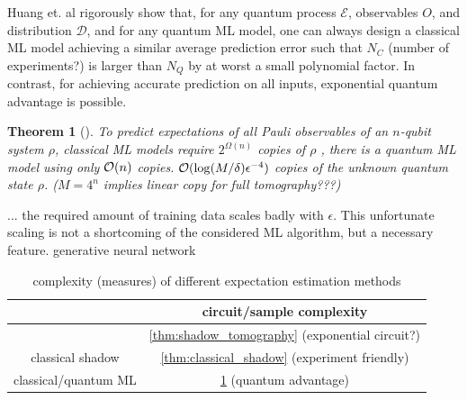 \documentclass[
reprint,
aps,
pra,
floatfix,
]{revtex4-2}
\theoremstyle{plain}
\newtheorem{theorem}{Theorem}
\theoremstyle{definition}
\newcommand{\ob}{O}
\newcommand{\dm}{\rho}
\begin{document}
Huang et. al rigorously show that, for any quantum process $\mathcal{E}$, observables $\ob$, and distribution $\mathcal{D}$, and for any quantum ML model, one can always design a classical ML model achieving a similar average prediction error such that $N_C$ (number of experiments?) is larger than $N_Q$ by at worst a small polynomial factor.
In contrast, for achieving accurate prediction on all inputs, exponential quantum advantage is possible.
\begin{theorem}[\cite{huangInformationtheoreticBoundsQuantum2021}]\label{thm:quantum_ml_estimate_bound}
	To predict expectations of all Pauli observables of an $n$-qubit system $\dm$, classical ML models require $2^{\Omega(n)}$ copies of $\dm$ , 
	there is a quantum ML model using only $\mathcal{O}(n)$ copies.
	$\mathcal{O}(\log(M/\delta)\epsilon^{-4})$ copies of the unknown quantum state $\dm$.
	($M=4^n$ implies linear copy for full tomography???)
\end{theorem}
\cite{huangPredictingManyProperties2020}
\cite{huangProvablyEfficientMachine2022}
\cite{huangInformationtheoreticBoundsQuantum2021}
\cite{huangPowerDataQuantum2021}
... the required amount of training data scales badly with $\epsilon$. This unfortunate scaling is not a shortcoming of the considered ML algorithm, but a necessary feature.
\cite{gaoEfficientRepresentationQuantum2017}
\cite{torlaiManybodyQuantumState2018}
generative neural network \cite{zhuFlexibleLearningQuantum2022}
\begin{table}[!ht]
	\centering
	\begin{tabular}{c|c}
		& circuit/sample complexity \\
		\hline
		\nameref{prm:shadow_tomography} & \cref{thm:shadow_tomography} (exponential circuit?) \\  
		classical shadow & \cref{thm:classical_shadow} (experiment friendly)  \\
		classical/quantum ML  &  %
		\cref{thm:quantum_ml_estimate_bound} (quantum advantage)\\  
		\hline
	\end{tabular}
	\caption{complexity (measures) of different expectation estimation methods}
\end{table}
	
\end{document}
